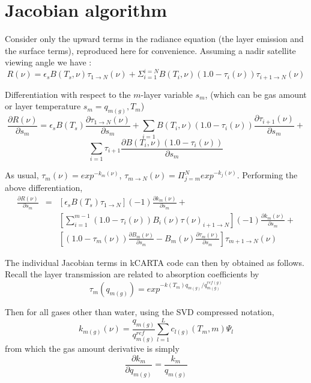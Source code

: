 \documentclass[11pt]{article}
\begin{document}
\section{Jacobian algorithm}

Consider only the upward terms in the radiance equation (the layer
emission and the surface terms), reproduced here for convenience.
Assuming a nadir satellite viewing angle we have :
\begin{equation}
R(\nu) = \epsilon_{s}B(T_{s},\nu) \tau_{1 \rightarrow N}(\nu) +
\Sigma_{i=1}^{i=N} B(T_{i},\nu) (1.0 - \tau_{i}(\nu)) 
\tau_{i+1 \rightarrow N}(\nu)
\end{equation}

Differentiation with respect to the $m$-layer variable $s_{m}$, (which can be
gas amount or layer temperature $s_{m} = q_{m(g)},T_{m}$)
\[
\frac{\partial R(\nu)}{\partial s_{m}} = \epsilon_{s}B(T_{s}) 
\frac{\partial \tau_{1 \rightarrow N}(\nu)}{\partial s_{m}} +
\sum_{i=1} B(T_{i},\nu) (1.0 - \tau_{i}(\nu))
\frac{\partial \tau_{i+1}(\nu)}{\partial s_{m}} + 
\]
\begin{equation}
\sum_{i=1} \tau_{i+1}\frac{\partial B(T_{i},\nu) (1.0 - \tau_{i}(\nu))}
{\partial s_{m}}
\end{equation}

As usual, $\tau_{m}(\nu) = exp^{-k_{m}(\nu)}$,
$\tau_{m \rightarrow N}(\nu) = \Pi_{j=m}^{N} exp^{-k_{j}(\nu)}$. Performing the
above differentiation,  
\begin{eqnarray*}
\frac{\partial R(\nu)}{\partial s_{m}} & = &
\left[
\epsilon_{s}B(T_{s}) \tau_{1 \rightarrow N} \right]
(-1)\frac{\partial k_{m}(\nu)}{\partial s_{m}} + \\
& & \left[ \sum_{i=1}^{m-1}(1.0 - \tau_{i}(\nu)) B_{i}(\nu) 
\tau(\nu)_{i+1 \rightarrow N}
\right](-1)\frac{\partial k_{m}(\nu)}{\partial s_{m}} + \\  
& & \left[(1.0-\tau_{m}(\nu))\frac{\partial B_{m}(\nu)}{\partial s_{m}} -
B_{m}(\nu)\frac{\partial \tau_{m}(\nu)}{\partial s_{m}}
\right]\tau_{m+1 \rightarrow N}(\nu)
\end{eqnarray*}

The individual Jacobian terms in \textsf{kCARTA} code can then by
obtained as follows. Recall the layer transmission are related to
absorption coefficients by
\begin{equation}
\tau_{m}(q_{m(g)}) = exp^{-k(T_{m})q_{m(g)}/q^{ref(g)}_{m(g)}}
\end{equation}

Then for all gases other than water, using the SVD compressed notation,
\begin{equation}
k_{m(g)}(\nu) = \frac{q_{m(g)}}{q^{ref}_{m(g)}}
                \sum_{l=1}^{L} c_{l(g)}(T_{m},m) \Psi_{l}
\end{equation}
from which the gas amount derivative is simply 
\begin{equation}
\frac{\partial k_{m}}{\partial q_{m(g)}} = \frac{k_{m}}{q_{m(g)}}
\end{equation}
\end{document}
